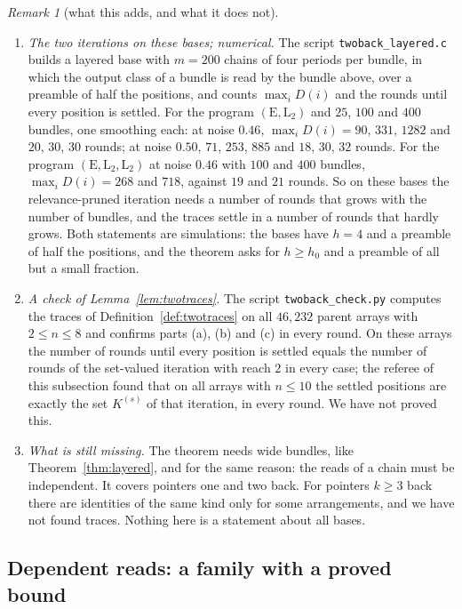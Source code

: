 \documentclass[11pt]{amsart}
\theoremstyle{definition}
\theoremstyle{remark}
\newtheorem{remark}[theorem]{Remark}
\begin{document}
\begin{remark}[what this adds, and what it does not]\label{rem:twolayered}
\begin{enumerate}[label=(\roman*),leftmargin=2.4em]
\item \emph{The two iterations on these bases; numerical.} The script
\texttt{twoback\_layered.c} builds a layered base with $m=200$ chains of four periods per
bundle, in which the output class of a bundle is read by the bundle above, over a preamble of
half the positions, and counts $\max_iD(i)$ and the rounds until every position is settled. For
the program $(\mathrm E,\mathrm L_2)$ and $25$, $100$ and $400$ bundles, one smoothing each:
at noise $0.46$, $\max_iD(i)=90$, $331$, $1282$ and $20$, $30$, $30$ rounds; at noise $0.50$,
$71$, $253$, $885$ and $18$, $30$, $32$ rounds. For the program
$(\mathrm E,\mathrm L_2,\mathrm L_2)$ at noise $0.46$ with $100$ and $400$ bundles,
$\max_iD(i)=268$ and $718$, against $19$ and $21$ rounds. So on these bases the
relevance-pruned iteration needs a number of rounds that grows with the number of bundles, and
the traces settle in a number of rounds that hardly grows. Both statements are simulations: the
bases have $h=4$ and a preamble of half the positions, and the theorem asks for $h\ge h_0$ and
a preamble of all but a small fraction.
\item \emph{A check of Lemma~\ref{lem:twotraces}.} The script \texttt{twoback\_check.py}
computes the traces of Definition~\ref{def:twotraces} on all $46{,}232$ parent arrays with
$2\le n\le8$ and confirms parts (a), (b) and (c) in every round. On these arrays the number of
rounds until every position is settled equals the number of rounds of the set-valued iteration
with reach $2$ in every case; the referee of this subsection found that on all arrays with
$n\le10$ the settled positions are exactly the set $K^{(s)}$ of that iteration, in every
round. We have not proved this.
\item \emph{What is still missing.} The theorem needs wide bundles, like
Theorem~\ref{thm:layered}, and for the same reason: the reads of a chain must be independent.
It covers pointers one and two back. For pointers $k\ge3$ back there are identities of the same
kind only for some arrangements, and we have not found traces. Nothing here is a statement
about all bases.
\end{enumerate}
\end{remark}

\subsection{Dependent reads: a family with a proved bound}\label{sec:scan}
\end{document}
